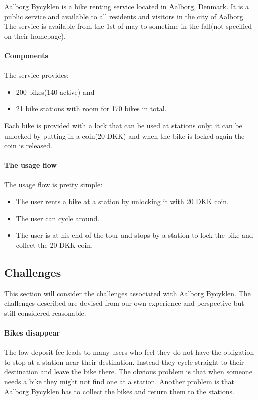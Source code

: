 \label{aalborg_bycyklen}
Aalborg Bycyklen is a bike renting service located in Aalborg, Denmark.
It is a public service and available to all residents and visitors in the city of Aalborg.
The service is available from the 1st of may to sometime in the fall(not specified on their homepage).\cite{aalborgbycyklenbagcyklen}


\paragraph{Components}
The service provides:
\begin{itemize}
\item 200 bikes(140 active) and 
\item 21 bike stations with room for 170 bikes in total.
\end{itemize}
Each bike is provided with a lock that can be used at stations only:
it can be unlocked by putting in a coin(20 DKK) and when the bike is locked again the coin is released.

\paragraph{The usage flow}
The usage flow is pretty simple:
\begin{itemize}
\item The user rents a bike at a station by unlocking it with 20 DKK coin.
\item The user can cycle around.
\item The user is at his end of the tour and stops by a station to lock the bike and collect the 20 DKK coin.
\end{itemize}

\subsection{Challenges}\label{aalborg_bycyklen:challenges}
This section will consider the challenges associated with Aalborg Bycyklen.
The challenges described are devised from our own experience and perspective but still considered reasonable.

\paragraph{Bikes disappear}
The low deposit fee leads to many users who feel they do not have the obligation to stop at a station near their destination.
Instead they cycle straight to their destination and leave the bike there.
The obvious problem is that when someone needs a bike they might not find one at a station.
Another problem is that Aalborg Bycyklen has to collect the bikes and return them to the stations.

